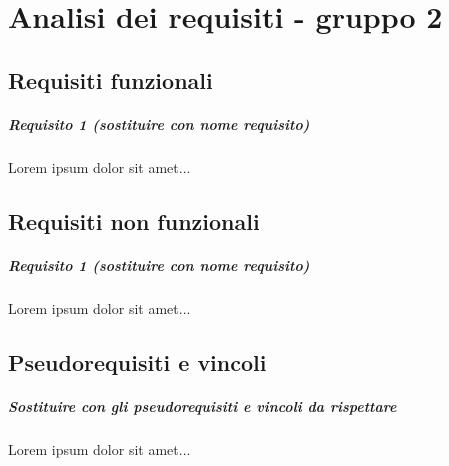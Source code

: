 
\chapter{Analisi dei requisiti - gruppo 2}
\label{ref:requisiti2}


\section{Requisiti funzionali}

\paragraph{Requisito 1 (sostituire con nome requisito) \\} 
Lorem ipsum dolor sit amet...

\section{Requisiti non funzionali}

\paragraph{Requisito 1 (sostituire con nome requisito) \\} 
Lorem ipsum dolor sit amet...

\section{Pseudorequisiti e vincoli}
\paragraph{Sostituire con gli pseudorequisiti e vincoli da rispettare \\}
Lorem ipsum dolor sit amet...

\newpage